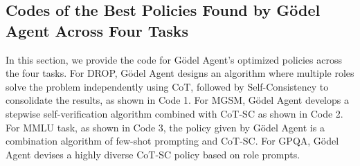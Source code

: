 \documentclass[11pt]{article}
\newcommand{\framework}{Gödel Agent\xspace}
\begin{document}
\subsection{Codes of the Best Policies Found by \framework Across Four Tasks}
\label{sec:maincode}
In this section, we provide the code for \framework's optimized policies across the four tasks. 
For DROP, \framework designs an algorithm where multiple roles solve the problem independently using CoT, followed by Self-Consistency to consolidate the results, as shown in Code 1.
For MGSM, \framework develops a stepwise self-verification algorithm combined with CoT-SC as shown in Code 2.
For MMLU task, as shown in Code 3, the policy given by \framework is a combination algorithm of few-shot prompting and CoT-SC.
For GPQA, \framework devises a highly diverse CoT-SC policy based on role prompts.
\end{document}
